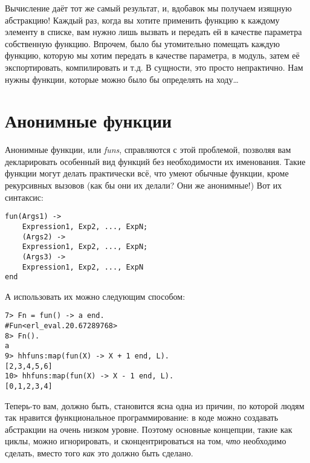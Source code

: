 Вычисление даёт тот же самый результат, и, вдобавок мы получаем изящную абстракцию!
Каждый раз, когда вы хотите применить функцию к каждому элементу в списке, вам нужно лишь вызвать  и передать ей в качестве параметра собственную функцию.
Впрочем, было бы утомительно помещать каждую функцию, которую мы хотим передать  в качестве параметра, в модуль, затем её экспортировать, компилировать и т.д.
В сущности, это просто непрактично.
Нам нужны функции, которые можно было бы определять на ходу\ldots
\section{Анонимные функции}
\label{anonymous-functions}
Анонимные функции, или \emph{funs}, справляются с этой проблемой, позволяя вам декларировать особенный вид функций без необходимости их именования.
Такие функции могут делать практически всё, что умеют обычные функции, кроме рекурсивных вызовов (как бы они их делали? Они же анонимные!) Вот их синтаксис:
\begin{lstlisting}[style=erlang]
fun(Args1) ->
    Expression1, Exp2, ..., ExpN;
    (Args2) ->
    Expression1, Exp2, ..., ExpN;
    (Args3) ->
    Expression1, Exp2, ..., ExpN
end
\end{lstlisting}
А использовать их можно следующим способом:
\begin{lstlisting}[style=erlang]
7> Fn = fun() -> a end.
#Fun<erl_eval.20.67289768>
8> Fn().
a
9> hhfuns:map(fun(X) -> X + 1 end, L).
[2,3,4,5,6]
10> hhfuns:map(fun(X) -> X - 1 end, L).
[0,1,2,3,4]
\end{lstlisting}
Теперь\--то вам, должно быть, становится ясна одна из причин, по которой людям так нравится функциональное программирование: в коде можно создавать абстракции на очень низком уровне.
Поэтому основные концепции, такие как циклы, можно игнорировать, и сконцентрироваться на том, \emph{что} необходимо сделать, вместо того \emph{как} это должно быть сделано.

